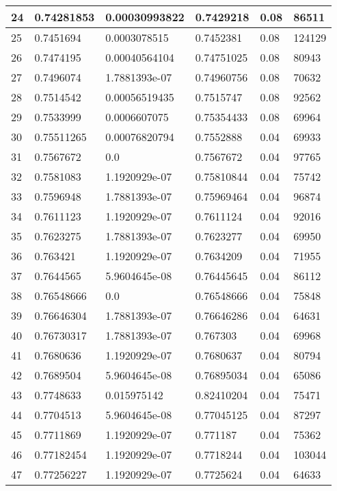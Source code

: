 \begin{longtable}{|l|l|l|l|l|l|}
24 & 0.74281853 & 0.00030993822 & 0.7429218 & 0.08 & 86511 \\ \hline 
25 & 0.7451694 & 0.0003078515 & 0.7452381 & 0.08 & 124129 \\ \hline 
26 & 0.7474195 & 0.00040564104 & 0.74751025 & 0.08 & 80943 \\ \hline 
27 & 0.7496074 & 1.7881393e-07 & 0.74960756 & 0.08 & 70632 \\ \hline 
28 & 0.7514542 & 0.00056519435 & 0.7515747 & 0.08 & 92562 \\ \hline 
29 & 0.7533999 & 0.0006607075 & 0.75354433 & 0.08 & 69964 \\ \hline 
30 & 0.75511265 & 0.00076820794 & 0.7552888 & 0.04 & 69933 \\ \hline 
31 & 0.7567672 & 0.0 & 0.7567672 & 0.04 & 97765 \\ \hline 
32 & 0.7581083 & 1.1920929e-07 & 0.75810844 & 0.04 & 75742 \\ \hline 
33 & 0.7596948 & 1.7881393e-07 & 0.75969464 & 0.04 & 96874 \\ \hline 
34 & 0.7611123 & 1.1920929e-07 & 0.7611124 & 0.04 & 92016 \\ \hline 
35 & 0.7623275 & 1.7881393e-07 & 0.7623277 & 0.04 & 69950 \\ \hline 
36 & 0.763421 & 1.1920929e-07 & 0.7634209 & 0.04 & 71955 \\ \hline 
37 & 0.7644565 & 5.9604645e-08 & 0.76445645 & 0.04 & 86112 \\ \hline 
38 & 0.76548666 & 0.0 & 0.76548666 & 0.04 & 75848 \\ \hline 
39 & 0.76646304 & 1.7881393e-07 & 0.76646286 & 0.04 & 64631 \\ \hline 
40 & 0.76730317 & 1.7881393e-07 & 0.767303 & 0.04 & 69968 \\ \hline 
41 & 0.7680636 & 1.1920929e-07 & 0.7680637 & 0.04 & 80794 \\ \hline 
42 & 0.7689504 & 5.9604645e-08 & 0.76895034 & 0.04 & 65086 \\ \hline 
43 & 0.7748633 & 0.015975142 & 0.82410204 & 0.04 & 75471 \\ \hline 
44 & 0.7704513 & 5.9604645e-08 & 0.77045125 & 0.04 & 87297 \\ \hline 
45 & 0.7711869 & 1.1920929e-07 & 0.771187 & 0.04 & 75362 \\ \hline 
46 & 0.77182454 & 1.1920929e-07 & 0.7718244 & 0.04 & 103044 \\ \hline 
47 & 0.77256227 & 1.1920929e-07 & 0.7725624 & 0.04 & 64633 \\ \hline 

\end{longtable}
